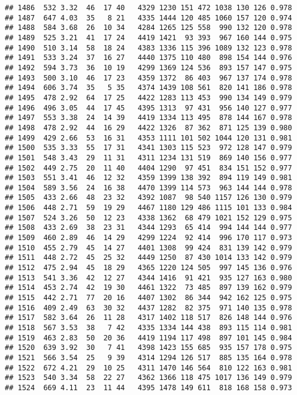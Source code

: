 \documentclass[]{article}
\begin{document}
\begin{verbatim}
## 1486  532 3.32  46  17 40   4329 1230 151 472 1038 130 126 0.978
## 1487  647 4.03  35   8 21   4335 1444 120 485 1060 157 120 0.974
## 1488  584 3.68  26  10 34   4284 1265 125 558  990 132 120 0.978
## 1489  525 3.21  41  17 24   4419 1421  93 393  967 160 144 0.975
## 1490  510 3.14  58  18 24   4383 1336 115 396 1089 132 123 0.978
## 1491  533 3.24  37  16 27   4440 1375 110 480  898 154 144 0.976
## 1492  594 3.73  36  10 19   4299 1369 124 536  893 157 147 0.975
## 1493  500 3.10  46  17 23   4359 1372  86 403  967 137 174 0.978
## 1494  606 3.74  35   5 35   4374 1439 108 561  820 141 186 0.978
## 1495  478 2.92  64  17 25   4422 1283 113 453  990 134 149 0.979
## 1496  496 3.05  44  17 45   4395 1313  97 431  956 140 127 0.977
## 1497  553 3.38  24  14 39   4419 1334 113 495  878 144 167 0.978
## 1498  478 2.92  44  16 29   4422 1326  87 362  871 125 139 0.980
## 1499  429 2.66  53  16 31   4353 1111 101 502 1044 120 131 0.981
## 1500  535 3.33  55  17 31   4341 1303 115 523  972 128 147 0.979
## 1501  548 3.43  29  11 31   4311 1234 131 519  869 140 156 0.977
## 1502  449 2.75  20  11 40   4404 1290  97 451  834 151 152 0.977
## 1503  551 3.41  46  12 32   4359 1399 138 392  894 119 149 0.981
## 1504  589 3.56  24  16 38   4470 1399 114 573  963 144 144 0.978
## 1505  433 2.66  48  23 32   4392 1087  98 540 1157 126 130 0.979
## 1506  448 2.71  59  19 29   4467 1180 129 486 1115 101 133 0.984
## 1507  524 3.26  50  12 23   4338 1362  68 479 1021 152 129 0.975
## 1508  433 2.69  38  23 31   4344 1293  65 414  994 144 144 0.977
## 1509  460 2.89  46  14 29   4299 1224  92 414  996 170 117 0.973
## 1510  455 2.79  45  14 27   4401 1308  99 424  831 139 142 0.979
## 1511  448 2.72  45  25 32   4449 1250  87 430 1014 133 142 0.979
## 1512  475 2.94  45  18 29   4365 1220 124 505  997 145 136 0.976
## 1513  541 3.36  42  12 27   4344 1416  91 421  935 127 163 0.980
## 1514  453 2.74  42  19 30   4461 1322  73 485  897 139 162 0.979
## 1515  442 2.71  77  20 16   4407 1302  86 344  942 162 125 0.975
## 1516  409 2.49  63  30 32   4437 1282  82 375  971 140 135 0.978
## 1517  582 3.64  26  11 28   4317 1402 118 517  826 148 144 0.976
## 1518  567 3.53  38   7 42   4335 1334 144 438  893 115 114 0.981
## 1519  463 2.83  50  20 36   4419 1194 117 498  897 101 145 0.984
## 1520  639 3.92  30   7 41   4398 1423 155 685  935 157 178 0.975
## 1521  566 3.54  25   9 39   4314 1294 126 517  885 135 164 0.978
## 1522  672 4.21  29  10 25   4311 1470 146 564  810 122 163 0.981
## 1523  540 3.34  58  22 27   4362 1366 118 475 1017 136 149 0.979
## 1524  669 4.11  23  11 44   4395 1478 149 611  818 168 158 0.973

\end{verbatim}
\end{document}
